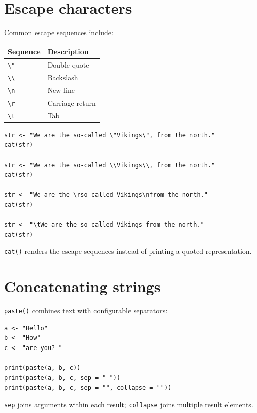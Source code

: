\section{Escape characters}

Common escape sequences include:

\begin{dstable}
\begin{tabularx}{\linewidth}{@{}p{2.4cm}X@{}}
\toprule
\rowcolor{DSPaleBlue!92}
Sequence & Description \\
\midrule
\texttt{\textbackslash"} & Double quote \\
\texttt{\textbackslash\textbackslash} & Backslash \\
\texttt{\textbackslash n} & New line \\
\texttt{\textbackslash r} & Carriage return \\
\texttt{\textbackslash t} & Tab \\
\bottomrule
\end{tabularx}
\end{dstable}

\begin{lstlisting}[style=dsr]
str <- "We are the so-called \"Vikings\", from the north."
cat(str)

str <- "We are the so-called \\Vikings\\, from the north."
cat(str)

str <- "We are the \rso-called Vikings\nfrom the north."
cat(str)

str <- "\tWe are the so-called Vikings from the north."
cat(str)
\end{lstlisting}

\texttt{cat()} renders the escape sequences instead of printing a quoted representation.

\section{Concatenating strings}

\texttt{paste()} combines text with configurable separators:

\begin{lstlisting}[style=dsr]
a <- "Hello"
b <- "How"
c <- "are you? "

print(paste(a, b, c))
print(paste(a, b, c, sep = "-"))
print(paste(a, b, c, sep = "", collapse = ""))
\end{lstlisting}

\texttt{sep} joins arguments within each result; \texttt{collapse} joins multiple result elements.

